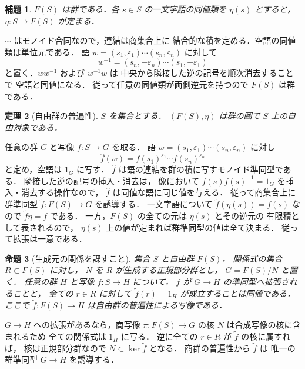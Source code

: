 \documentclass[a5paper,10pt,onecolumn]{jsarticle}
\makeatletter
\theoremstyle{mathnotetheorem}
\newtheorem{theorem}{定理}[section]
\newtheorem{lemma}[theorem]{補題}
\newtheorem{proposition}[theorem]{命題}
\renewcommand{\proofname}{証明}
\renewenvironment{proof}[1][\proofname]{%
  \par\pushQED{\qed}\normalfont\topsep4\p@\@plus2\p@\relax
  \trivlist\item[\hskip\labelsep\bfseries #1]\ignorespaces
}{\popQED\endtrivlist\@endpefalse}
\makeatother
\begin{document}
\begin{lemma}\label{lem:free-group}
$F(S)$ は群である．各 $s\in S$ の一文字語の同値類を
$\eta(s)$ とすると，
$\eta:S\to F(S)$ が定まる．
\end{lemma}
\begin{proof}
$\sim$ はモノイド合同なので，連結は商集合上に
結合的な積を定める．空語の同値類は単位元である．
語 $w=(s_1,\varepsilon_1)\cdots(s_n,\varepsilon_n)$ に対して
\[
 w^{-1}=(s_n,-\varepsilon_n)\cdots(s_1,-\varepsilon_1)
\]
と置く．$ww^{-1}$ および $w^{-1}w$ は
中央から隣接した逆の記号を順次消去することで
空語と同値になる．
従って任意の同値類が両側逆元を持つので
$F(S)$ は群である．
\end{proof}

\begin{theorem}[自由群の普遍性]\label{thm:free-group}
$S$ を集合とする．
$(F(S),\eta)$ は群の圏で $S$ 上の自由対象である．
\end{theorem}
\begin{proof}
任意の群 $G$ と写像 $f:S\to G$ を取る．
語 $w=(s_1,\varepsilon_1)\cdots(s_n,\varepsilon_n)$ に対し
\[
 \widehat f(w)=
 f(s_1)^{\varepsilon_1}\cdots f(s_n)^{\varepsilon_n}
\]
と定め，空語は $1_G$ に写す．
$\widehat f$ は語の連結を群の積に写すモノイド準同型である．
隣接した逆の記号の挿入・消去は，
像において $f(s)f(s)^{-1}=1_G$ を挿入・消去する操作なので，
$\widehat f$ は同値な語に同じ値を与える．
従って商集合上に群準同型
$\widetilde f:F(S)\to G$ を誘導する．
一文字語について
$\widetilde f(\eta(s))=f(s)$ なので
$\widetilde f\eta=f$ である．
一方，$F(S)$ の全ての元は $\eta(s)$ とその逆元の
有限積として表されるので，
$\eta(s)$ 上の値が定まれば群準同型の値は全て決まる．
従って拡張は一意である．
\end{proof}

\begin{proposition}[生成元の関係を課すこと]\label{prop:presentation}
集合 $S$ と自由群 $F(S)$，
関係式の集合 $R\subset F(S)$ に対し，
$N$ を $R$ が生成する正規部分群とし，
$G=F(S)/N$ と置く．
任意の群 $H$ と写像 $f:S\to H$ について，
$f$ が $G\to H$ の準同型へ拡張されることと，
全ての $r\in R$ に対して
$\widetilde f(r)=1_H$ が成立することは同値である．
ここで $\widetilde f:F(S)\to H$ は自由群の普遍性による写像である．
\end{proposition}
\begin{proof}
$G\to H$ への拡張があるなら，商写像
$\pi:F(S)\to G$ の核 $N$ は合成写像の核に含まれるため
全ての関係式は $1_H$ に写る．
逆に全ての $r\in R$ が $\widetilde f$ の核に属すれば，
核は正規部分群なので $N\subset\ker\widetilde f$ となる．
商群の普遍性から $\widetilde f$ は
唯一の群準同型 $G\to H$ を誘導する．
\end{proof}
\end{document}
